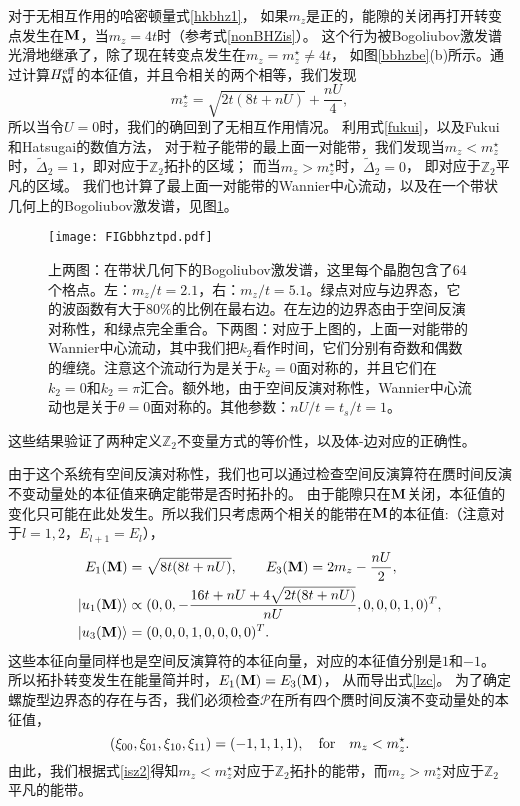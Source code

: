 对于无相互作用的哈密顿量式\eqref{hkbhz1}，
如果$m_z$是正的，能隙的关闭再打开转变点发生在$\vb M$，当$m_z=4t$时（参考式\eqref{nonBHZis}）。
这个行为被Bogoliubov激发谱光滑地继承了，除了现在转变点发生在$m_z=m_z^\star\neq4t$，
如图\ref{bbhzbe}(b)所示。通过计算$H_{\vb M}^{\text{eff}}$的本征值，并且令相关的两个相等，我们发现
\begin{equation}\label{lzc}
	m_z^\star= \sqrt{2t(8t+nU)}+\frac{nU}{4},
\end{equation}
所以当令$U=0$时，我们的确回到了无相互作用情况。
利用式\eqref{fukui}，以及Fukui和Hatsugai的数值方法\cite{Fukui2007}，
对于粒子能带的最上面一对能带，我们发现当$m_z<m_z^\star$时，$\tilde \Delta_2=1$，即对应于$\mathbb Z_2$拓扑的区域；
而当$m_z>m_z^\star$时，$\tilde \Delta_2=0$，
即对应于$\mathbb Z_2$平凡的区域。
我们也计算了最上面一对能带的Wannier中心流动，以及在一个带状几何上的Bogoliubov激发谱，见图\ref{bbhztpd}。%
\begin{figure}[th!]
\centering
	\texttt{[image: FIGbbhztpd.pdf]}
	\caption{上两图：在带状几何下的Bogoliubov激发谱，这里每个晶胞包含了64个格点。左：$m_z/t=2.1$，右：$m_z/t=5.1$。绿点对应与边界态，它的波函数有大于$80\%$的比例在最右边。在左边的边界态由于空间反演对称性，和绿点完全重合。下两图：对应于上图的，上面一对能带的Wannier中心流动，其中我们把$k_2$看作时间，它们分别有奇数和偶数的缠绕。注意这个流动行为是关于$k_2=0$面对称的，并且它们在$k_2=0$和$k_2=\pi$汇合。额外地，由于空间反演对称性，Wannier中心流动也是关于$\theta=0$面对称的。其他参数：$nU/t=t_s/t=1$。}
	\label{bbhztpd}
\end{figure}
这些结果验证了两种定义$\mathbb Z_2$不变量方式的等价性，以及体-边对应的正确性。

由于这个系统有空间反演对称性，我们也可以通过检查空间反演算符在赝时间反演不变动量处的本征值来确定能带是否时拓扑的。
由于能隙只在$\vb M$关闭，本征值的变化只可能在此处发生。所以我们只考虑两个相关的能带在$\vb M$的本征值:（注意对于$l=1,2$，$E_{l+1}=E_l$），
\begin{equation*}
	\begin{split}
		E_1(\vb M) &=\sqrt{8t(8t+nU)},\qquad E_3(\vb M)=2m_z-\frac{nU}{2}, \\
		\ket{u_1(\vb M)} &\propto (0,0,-\frac{16t + nU +4\sqrt{2t(8t+nU)}}{nU},0,0,0,1,0)^T, \\ \ket{u_3(\vb M)} &= (0,0,0,1,0,0,0,0)^T.
	\end{split}
\end{equation*}
这些本征向量同样也是空间反演算符的本征向量，对应的本征值分别是$1$和$-1$。
所以拓扑转变发生在能量简并时，$E_1(\vb M)=E_3(\vb M)$，
从而导出式\eqref{lzc}。
为了确定螺旋型边界态的存在与否，我们必须检查$\mathcal P$在所有四个赝时间反演不变动量处的本征值，
\begin{equation*}
	(\xi_{00},\xi_{01},\xi_{10},\xi_{11})=(-1,1,1,1),\qfor m_z<m_z^\star.
\end{equation*}
由此，我们根据式\eqref{isz2}得知$m_z<m_z^\star$对应于$\mathbb Z_2$拓扑的能带，而$m_z>m_z^\star$对应于$\mathbb Z_2$平凡的能带。

